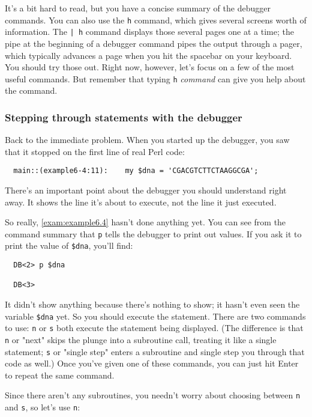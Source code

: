 It's a bit hard to read, but you have a concise summary of the debugger commands. You can also use the \verb|h| command, which gives several screens worth of information. The \verb=| h= command displays those several pages one at a time; the pipe at the beginning of a debugger command pipes the output through a pager, which typically advances a page when you hit the spacebar on your keyboard. You should try those out. Right now, however, let's focus on a few of the most useful commands. But remember that typing \verb|h| \textit{command} can give you help about the command. 

\subsubsection{Stepping through statements with the debugger}
Back to the immediate problem. When you started up the debugger, you saw that it stopped on the first line of real Perl code:

\begin{lstlisting}
  main::(example6-4:11):    my $dna = 'CGACGTCTTCTAAGGCGA';
\end{lstlisting}

There's an important point about the debugger you should understand right away. It shows the line it's about to execute, not the line it just executed.

So really, \autoref{exam:example6.4} hasn't done anything yet. You can see from the command summary that \verb|p| tells the debugger to print out values. If you ask it to print the value of \verb|$dna|, you'll find:

\begin{lstlisting}
  DB<2> p $dna

  DB<3> 
\end{lstlisting}

It didn't show anything because there's nothing to show; it hasn't even seen the variable \verb|$dna| yet. So you should execute the statement. There are two commands to use: \verb|n| or \verb|s| both execute the statement being displayed. (The difference is that \verb|n| or "next" skips the plunge into a subroutine call, treating it like a single statement; \verb|s| or "single step" enters a subroutine and single step you through that code as well.) Once you've given one of these commands, you can just hit Enter to repeat the same command.

Since there aren't any subroutines, you needn't worry about choosing between \verb|n| and \verb|s|, so let's use \verb|n|: 

